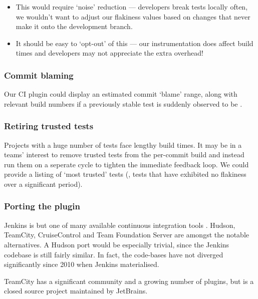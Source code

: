 \begin{itemize}
	\item This would require {\lq}noise{\rq} reduction --- developers break tests locally often, we wouldn't want to adjust our flakiness values based on changes that never make it onto the development branch.
	\item It should be easy to {\lq}opt-out{\rq} of this --- our instrumentation does affect build times and developers may not appreciate the extra overhead!
\end{itemize}

\subsubsection{Commit blaming}

Our CI plugin could display an estimated commit {\lq}blame{\rq} range, along with relevant build numbers if a previously stable test is suddenly observed to be \flaky{}.

\subsubsection{Retiring trusted tests}

Projects with a huge number of tests face lengthy build times. It may be in a teams' interest to remove trusted tests from the per-commit build and instead run them on a seperate cycle to tighten the immediate feedback loop. We could provide a listing of {\lq}most trusted{\rq} tests (\ie, tests that have exhibited no flakiness over a significant period).

\subsubsection{Porting the plugin}

Jenkins is but one of many available continuous integration tools \cite{ContinuousIntegrationSoftware}. Hudson, TeamCity, CruiseControl and Team Foundation Server are amongst the notable alternatives. A Hudson port would be especially trivial, since the Jenkins codebase is still fairly similar. In fact, the code-bases have not diverged significantly since 2010 when Jenkins materialised.

TeamCity \cite{TeamCity} has a significant community and a growing number of plugins, but is a closed source project maintained by JetBrains.

